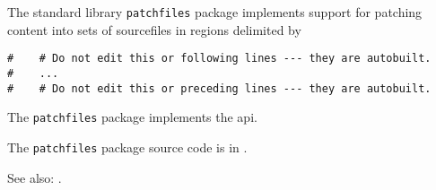 
The standard library {\tt patchfiles} package implements support for patching content into sets of sourcefiles in regions delimited by
\begin{verbatim}
#    # Do not edit this or following lines --- they are autobuilt.
#    ...
#    # Do not edit this or preceding lines --- they are autobuilt.
\end{verbatim}

The {\tt patchfiles} package implements the  api.

The {\tt patchfiles} package source code is in .

See also:  .



